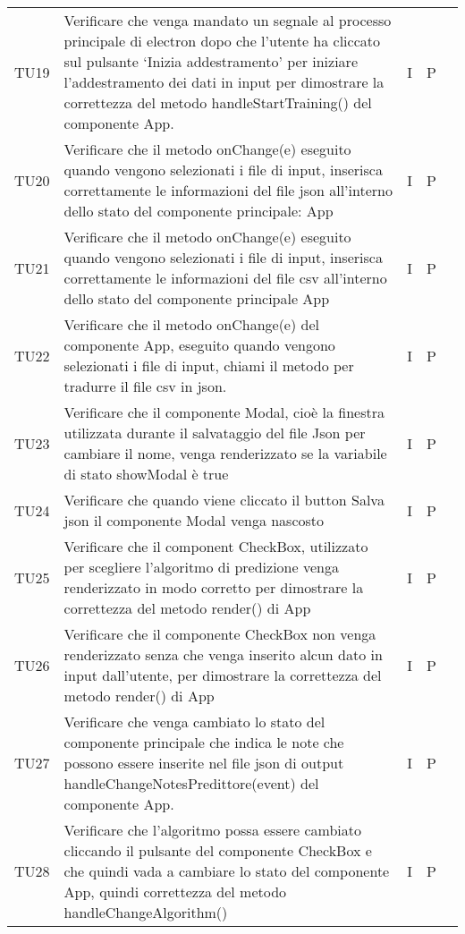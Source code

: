 \begin{longtable} {
		>{}p{15mm} 
		>{}p{79.5mm}
		>{}p{15mm} 
		>{}p{15mm}
		>{}p{0mm}}
	TU19	& Verificare che venga mandato un segnale al processo principale di electron dopo che l’utente ha cliccato sul pulsante ‘Inizia addestramento’ per iniziare l’addestramento dei dati in input per dimostrare la correttezza del metodo handleStartTraining() del componente App. & I & P &\TBstrut \\ [2mm]
	TU20	& Verificare che il metodo onChange(e) eseguito quando vengono selezionati i file di input, inserisca correttamente le informazioni del file json all'interno dello stato del componente principale: App & I & P &\TBstrut \\ [2mm]
	TU21	& Verificare che il metodo onChange(e) eseguito quando vengono selezionati i file di input, inserisca correttamente le informazioni del file csv all'interno dello stato del componente principale App & I & P &\TBstrut \\ [2mm]
	TU22	& Verificare che il metodo onChange(e) del componente App, eseguito quando vengono selezionati i file di input, chiami il metodo per tradurre il file csv in json. & I & P &\TBstrut \\ [2mm]
	TU23	& Verificare che il componente Modal, cioè la finestra utilizzata durante il salvataggio del file Json per cambiare il nome, venga renderizzato se la variabile di stato showModal è true & I & P &\TBstrut \\ [2mm]
	TU24	& Verificare che quando viene cliccato il button Salva json il componente Modal venga nascosto & I & P &\TBstrut \\ [2mm]
	TU25	& Verificare che il component CheckBox, utilizzato per scegliere l'algoritmo di predizione venga renderizzato in modo corretto per dimostrare la correttezza del metodo render() di App & I & P &\TBstrut \\ [2mm]
	TU26	& Verificare che il componente CheckBox non venga renderizzato senza che venga inserito alcun dato in input dall'utente, per dimostrare la correttezza del metodo render() di App & I & P &\TBstrut \\ [2mm]
	TU27	& Verificare che venga cambiato lo stato del componente principale che indica le note che possono essere inserite nel file json di output handleChangeNotesPredittore(event) del componente App. & I & P &\TBstrut \\ [2mm]
	TU28	& Verificare che l'algoritmo possa essere cambiato cliccando il pulsante del componente CheckBox e che quindi vada a cambiare lo stato del componente App, quindi correttezza del metodo handleChangeAlgorithm() & I & P &\TBstrut \\ [2mm]

\end{longtable}
